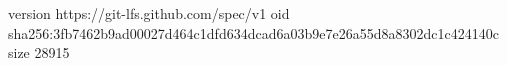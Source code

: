 version https://git-lfs.github.com/spec/v1
oid sha256:3fb7462b9ad00027d464c1dfd634dcad6a03b9e7e26a55d8a8302dc1c424140c
size 28915
